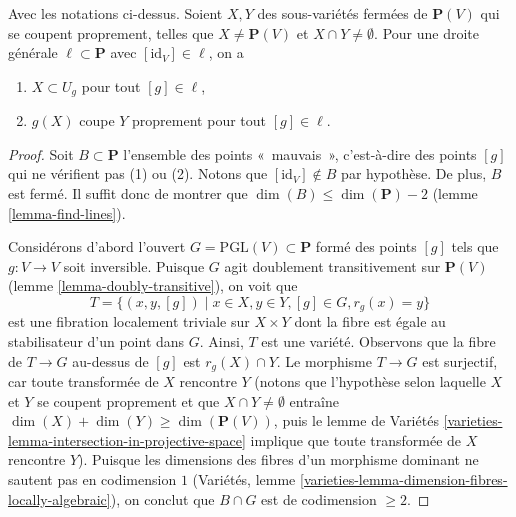 \begin{lemma}
\label{lemma-make-family}
Avec les notations ci-dessus. Soient $X, Y$ des sous-variétés fermées de $\mathbf{P}(V)$
qui se coupent proprement, telles que $X \not = \mathbf{P}(V)$ et
$X \cap Y \not = \emptyset$. Pour une droite générale $\ell \subset \mathbf{P}$
avec $[\text{id}_V] \in \ell$, on a
\begin{enumerate}
\item $X \subset U_g$ pour tout $[g] \in \ell$,
\item $g(X)$ coupe $Y$ proprement pour tout $[g] \in \ell$.
\end{enumerate}
\end{lemma}

\begin{proof}
Soit $B \subset \mathbf{P}$ l'ensemble des points «~mauvais~», c'est-à-dire des
points $[g]$ qui ne vérifient pas (1) ou (2). Notons que
$[\text{id}_V] \not \in B$ par hypothèse. De plus, $B$ est fermé.
Il suffit donc de montrer que $\dim(B) \leq \dim(\mathbf{P}) - 2$
(lemme \ref{lemma-find-lines}).

\medskip\noindent
Considérons d'abord l'ouvert $G = \text{PGL}(V) \subset \mathbf{P}$
formé des points $[g]$ tels que $g : V \to V$ soit inversible.
Puisque $G$ agit doublement transitivement sur $\mathbf{P}(V)$
(lemme \ref{lemma-doubly-transitive}),
on voit que
$$
T = \{(x, y, [g]) \mid x \in X, y \in Y, [g] \in G, r_g(x) = y\}
$$
est une fibration localement triviale sur $X \times Y$ dont la fibre est égale
au stabilisateur d'un point dans $G$. Ainsi, $T$ est une variété.
Observons que la fibre de $T \to G$ au-dessus de $[g]$ est $r_g(X) \cap Y$.
Le morphisme $T \to G$ est surjectif, car toute transformée de $X$
rencontre $Y$ (notons que l'hypothèse selon laquelle $X$ et $Y$ se coupent
proprement et que $X \cap Y \not = \emptyset$ entraîne
$\dim(X) + \dim(Y) \geq \dim(\mathbf{P}(V))$, puis le
lemme de Variétés \ref{varieties-lemma-intersection-in-projective-space}
implique que toute transformée de $X$ rencontre $Y$).
Puisque les dimensions des fibres d'un morphisme dominant ne
sautent pas en codimension $1$
(Variétés, lemme \ref{varieties-lemma-dimension-fibres-locally-algebraic}),
on conclut que $B \cap G$ est de codimension $\geq 2$.


\end{proof}

